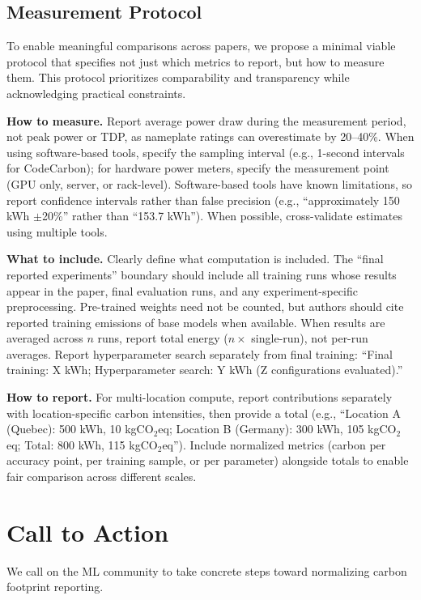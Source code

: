 \documentclass{article}
\theoremstyle{plain}
\theoremstyle{definition}
\theoremstyle{remark}
\begin{document}
\subsection{Measurement Protocol}

To enable meaningful comparisons across papers, we propose a minimal viable protocol that specifies not just which metrics to report, but how to measure them. This protocol prioritizes comparability and transparency while acknowledging practical constraints.

\textbf{How to measure.} Report average power draw during the measurement period, not peak power or TDP, as nameplate ratings can overestimate by 20--40\%. When using software-based tools, specify the sampling interval (e.g., 1-second intervals for CodeCarbon); for hardware power meters, specify the measurement point (GPU only, server, or rack-level). Software-based tools have known limitations, so report confidence intervals rather than false precision (e.g., ``approximately 150 kWh $\pm$20\%'' rather than ``153.7 kWh''). When possible, cross-validate estimates using multiple tools.

\textbf{What to include.} Clearly define what computation is included. The ``final reported experiments'' boundary should include all training runs whose results appear in the paper, final evaluation runs, and any experiment-specific preprocessing. Pre-trained weights need not be counted, but authors should cite reported training emissions of base models when available. When results are averaged across $n$ runs, report total energy ($n \times$ single-run), not per-run averages. Report hyperparameter search separately from final training: ``Final training: X kWh; Hyperparameter search: Y kWh (Z configurations evaluated).''

\textbf{How to report.} For multi-location compute, report contributions separately with location-specific carbon intensities, then provide a total (e.g., ``Location A (Quebec): 500 kWh, 10 kgCO$_2$eq; Location B (Germany): 300 kWh, 105 kgCO$_2$eq; Total: 800 kWh, 115 kgCO$_2$eq''). Include normalized metrics (carbon per accuracy point, per training sample, or per parameter) alongside totals to enable fair comparison across different scales.

\section{Call to Action}

We call on the ML community to take concrete steps toward normalizing carbon footprint reporting.
\end{document}
